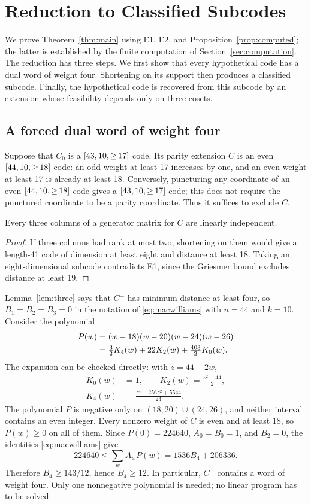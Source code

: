 \section{Reduction to Classified Subcodes}
\label{sec:reduction}
We prove Theorem~\ref{thm:main} using E1, E2, and Proposition~\ref{prop:computed}; the latter is established by the finite computation of Section~\ref{sec:computation}. The reduction has three steps. We first show that every hypothetical code has a dual word of weight four. Shortening on its support then produces a classified subcode. Finally, the hypothetical code is recovered from this subcode by an extension whose feasibility depends only on three cosets.

\subsection{A forced dual word of weight four}
Suppose that $C_0$ is a $\mbox{\ensuremath{[43,10,{\ge}\,17]}}$ code. Its parity extension $C$ is an even $\mbox{\ensuremath{[44,10,{\ge}\,18]}}$ code: an odd weight at least 17 increases by one, and an even weight at least 17 is already at least 18. Conversely, puncturing any coordinate of an even $\mbox{\ensuremath{[44,10,{\ge}\,18]}}$ code gives a $\mbox{\ensuremath{[43,10,{\ge}\,17]}}$ code; this does not require the punctured coordinate to be a parity coordinate. Thus it suffices to exclude $C$.

\begin{lemma}\label{lem:three}
Every three columns of a generator matrix for $C$ are linearly independent.
\end{lemma}
\begin{proof}
If three columns had rank at most two, shortening on them would give a length-41 code of dimension at least eight and distance at least 18. Taking an eight-dimensional subcode contradicts E1, since the Griesmer bound excludes distance at least 19.
\end{proof}
Lemma~\ref{lem:three} says that $C^\perp$ has minimum distance at least four, so $B_1=B_2=B_3=0$ in the notation of \eqref{eq:macwilliams} with $n=44$ and $k=10$. Consider the polynomial
\begin{align}
 P(w)&=(w-18)(w-20)(w-24)(w-26)\notag\\
 &=\tfrac32K_4(w)+22K_2(w)+\tfrac{403}{2}K_0(w).
 \label{eq:polynomial}
\end{align}
The expansion can be checked directly: with $z=44-2w$,
\begin{align*}
 K_0(w)&=1,\qquad K_2(w)=\frac{z^2-44}{2},\\
 K_4(w)&=\frac{z^4-256z^2+5544}{24}.
\end{align*}
The polynomial $P$ is negative only on $(18,20)\cup(24,26)$, and neither interval contains an even integer. Every nonzero weight of $C$ is even and at least 18, so $P(w)\ge0$ on all of them. Since $P(0)=224640$, $A_0=B_0=1$, and $B_2=0$, the identities \eqref{eq:macwilliams} give
\[
 224640\le\sum_w A_wP(w)=1536B_4+206336.
\]
Therefore $B_4\ge143/12$, hence $B_4\ge12$. In particular, $C^\perp$ contains a word of weight four. Only one nonnegative polynomial is needed; no linear program has to be solved.

